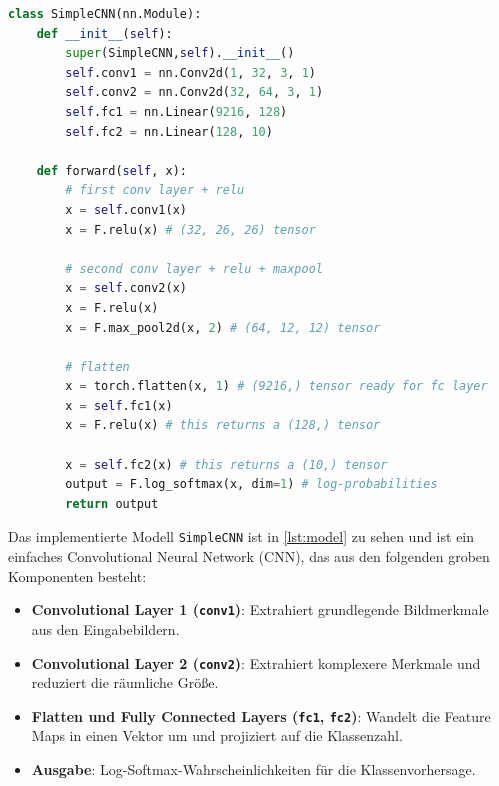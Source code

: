 \documentclass{article}
\begin{document}
\begin{lstlisting}[language=Python, caption={\texttt{model.py}: CNN Modell}, label={lst:model}, 
basicstyle=\ttfamily\small, keywordstyle=\color{blue}\bfseries, commentstyle=\color{green!60!black}, stringstyle=\color{orange}]
class SimpleCNN(nn.Module):
    def __init__(self):
        super(SimpleCNN,self).__init__()
        self.conv1 = nn.Conv2d(1, 32, 3, 1)
        self.conv2 = nn.Conv2d(32, 64, 3, 1)
        self.fc1 = nn.Linear(9216, 128)
        self.fc2 = nn.Linear(128, 10)
    
    def forward(self, x):
        # first conv layer + relu
        x = self.conv1(x)
        x = F.relu(x) # (32, 26, 26) tensor
        
        # second conv layer + relu + maxpool
        x = self.conv2(x)
        x = F.relu(x)
        x = F.max_pool2d(x, 2) # (64, 12, 12) tensor
        
        # flatten
        x = torch.flatten(x, 1) # (9216,) tensor ready for fc layer
        x = self.fc1(x)
        x = F.relu(x) # this returns a (128,) tensor
        
        x = self.fc2(x) # this returns a (10,) tensor
        output = F.log_softmax(x, dim=1) # log-probabilities
        return output
\end{lstlisting}
Das implementierte Modell \texttt{SimpleCNN} ist in \ref{lst:model} zu sehen und ist ein einfaches Convolutional Neural Network (CNN), 
das aus den folgenden groben Komponenten besteht:

\begin{itemize}
    \item \textbf{Convolutional Layer 1 (\texttt{conv1})}: Extrahiert grundlegende Bildmerkmale aus den Eingabebildern.
    \item \textbf{Convolutional Layer 2 (\texttt{conv2})}: Extrahiert komplexere Merkmale und reduziert die räumliche Größe.
    \item \textbf{Flatten und Fully Connected Layers (\texttt{fc1}, \texttt{fc2})}: Wandelt die Feature Maps in einen Vektor um und projiziert auf die Klassenzahl.
    \item \textbf{Ausgabe}: Log-Softmax-Wahrscheinlichkeiten für die Klassenvorhersage.
\end{itemize}
\end{document}
